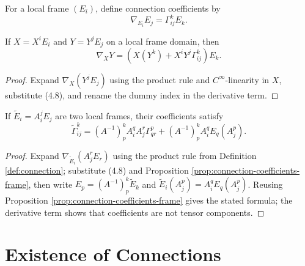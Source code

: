 For a local frame $(E_i)$, define connection coefficients by
\begin{equation}
\nabla_{E_i}E_j=\Gamma^k_{ij}E_k.\tag{4.8}
\end{equation}
\begin{proposition}
\label{prop:connection-coefficients-frame}





If $X=X^iE_i$ and $Y=Y^jE_j$ on a local frame domain, then
\begin{equation}
\nabla_XY=\left(X(Y^k)+X^iY^j\Gamma^k_{ij}\right)E_k.\tag{4.9}
\end{equation}
\end{proposition}
\begin{proof}
\sketch Expand $\nabla_X(Y^jE_j)$ using the product rule and $C^\infty$-linearity in $X$, substitute (4.8), and rename the dummy index in the derivative term.
\end{proof}

\begin{proposition}
\label{prop:transformation-law-connection-coefficients}





If $\widetilde E_i=A^j_iE_j$ are two local frames, their coefficients satisfy
\[
\widetilde\Gamma^k_{ij}=(A^{-1})^k_pA^q_iA^r_j\Gamma^p_{qr}+(A^{-1})^k_pA^q_iE_q(A^p_j).
\]
\end{proposition}
\begin{proof}

\sketch Expand $\nabla_{\widetilde E_i}(A^r_jE_r)$ using the product rule from Definition \ref{def:connection}; substitute (4.8) and Proposition \ref{prop:connection-coefficients-frame}, then write $E_p=(A^{-1})^k_p\widetilde E_k$ and $\widetilde E_i(A^p_j)=A^q_iE_q(A^p_j)$. Reusing Proposition \ref{prop:connection-coefficients-frame} gives the stated formula; the derivative term shows that coefficients are not tensor components.
\end{proof}

\section{Existence of Connections}

